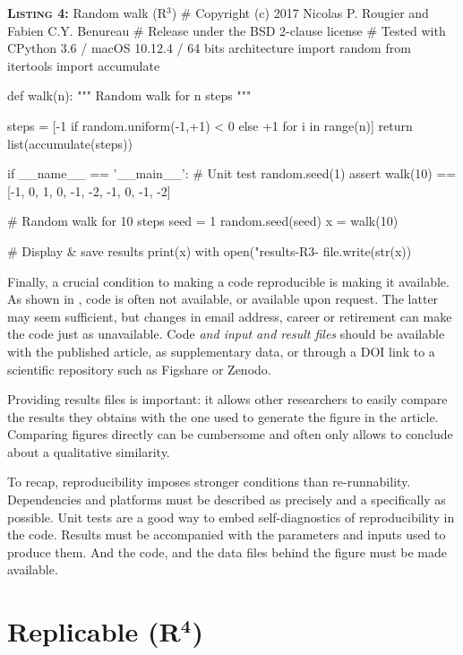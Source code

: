 
\begin{code}{\textbf{\textsc{Listing 4:}} Random walk (R$^3$)}
# Copyright (c) 2017 Nicolas P. Rougier and Fabien C.Y. Benureau
# Release under the BSD 2-clause license
# Tested with CPython 3.6 / macOS 10.12.4 / 64 bits architecture
import random
from itertools import accumulate

def walk(n):
    """ Random walk for n steps """
  
    steps = [-1 if random.uniform(-1,+1) < 0 else +1 for i in range(n)]
    return list(accumulate(steps))

if __name__ == '__main__':
    # Unit test
    random.seed(1)
    assert walk(10) == [-1, 0, 1, 0, -1, -2, -1, 0, -1, -2]

    # Random walk for 10 steps
    seed = 1
    random.seed(seed)
    x = walk(10)
    
    # Display & save results
    print(x)
    with open("results-R3-%
        file.write(str(x))
\end{code}

Finally, a crucial condition to making a code reproducible is making it available. As shown in \cite{Collberg:2016}, code is often not available, or available upon request. The latter may seem sufficient, but changes in email address,  career or retirement can make the code just as unavailable. Code \emph{and input and result files} should be available with the published article, as supplementary data, or through a DOI link to a scientific repository such as Figshare or Zenodo.

Providing results files is important: it allows other researchers to easily compare the results they obtains with the one used to generate the figure in the article. Comparing figures directly can be cumbersome and often only allows to conclude about a qualitative similarity.

To recap, reproducibility imposes stronger conditions than re-runnability. Dependencies and platforms must be described as precisely and a specifically as possible. Unit tests are a good way to embed self-diagnostics of reproducibility in the code. Results must be accompanied with the parameters and inputs used to produce them. And the code, and the data files behind the figure must be made available. 

\clearpage
\section*{Replicable (R$^{\mathbf 4}$)}

